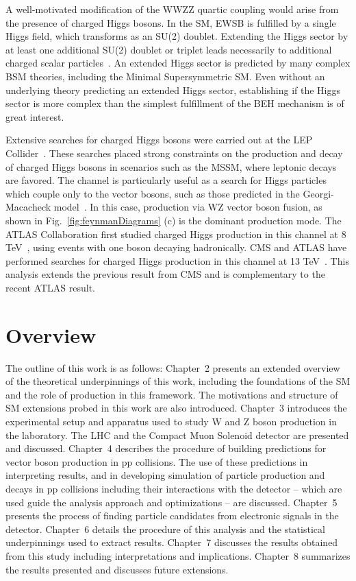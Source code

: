 A well-motivated modification of the WWZZ quartic coupling would arise from
the presence of charged Higgs bosons.
In the SM, EWSB is fulfilled by a single Higgs field, which transforms as an SU(2) doublet.
Extending the Higgs sector by at least one additional SU(2) doublet or triplet leads necessarily
to additional charged scalar particles~\cite{Arbey:2017gmh}. An extended Higgs sector is predicted by many
complex BSM theories, including the Minimal Supersymmetric SM. 
Even without an 
underlying theory predicting an extended Higgs sector, establishing if the Higgs 
sector is more complex than the simplest fulfillment of the BEH mechanism is of 
great interest.

Extensive searches for charged Higgs bosons were carried out at the 
LEP Collider~\cite{ALEPHCollaboration2013}. 
These searches placed strong constraints on the production
and decay of charged Higgs bosons in scenarios such as the MSSM, where leptonic
decays are favored. 
The \WZjj channel is particularly useful as a search for Higgs particles 
which couple only to the vector bosons, such as those predicted in the 
Georgi-Macacheck model~\cite{Georgi:1985nv}. In this case, production via WZ vector
boson fusion, as shown in Fig.~\ref{fig:feynmanDiagrams} (c) is the dominant 
production mode.
The ATLAS Collaboration first studied charged Higgs production in this channel
at 8 TeV~\cite{Aad:2015nfa}, using events with one boson decaying hadronically.
CMS and ATLAS have performed searches for charged Higgs production in this channel 
at 13 TeV~\cite{Sirunyan:2017sbn,Aaboud:2018ohp}. This analysis extends the previous result from CMS and is complementary
to the recent ATLAS result.

\section{Overview}

The outline of this work is as follows: Chapter~2 presents an extended 
overview of the theoretical underpinnings of this work, including the foundations
of the SM and the role of \EWWZ production in this framework. The motivations 
and structure of SM extensions probed in this work are also introduced.
Chapter~3 introduces the experimental setup and apparatus used to study W and 
Z boson production in the laboratory. The LHC and the Compact Muon Solenoid 
detector are presented and discussed. Chapter~4 describes the procedure of 
building predictions for vector boson production in pp collisions.
The use of these predictions in interpreting results, and in developing simulation
of particle production and decays in pp collisions including their interactions
with the detector -- which are used 
guide the analysis approach and optimizations -- are discussed. Chapter~5 presents
the process of finding particle candidates from electronic signals in the detector.
Chapter~6 details the procedure of this analysis and the statistical underpinnings
used to extract results. Chapter~7 discusses the results obtained from this study
including interpretations and implications. Chapter~8 summarizes the
results presented and discusses future extensions.

